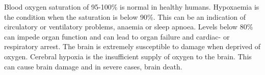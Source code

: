 \medskip
Blood oxygen saturation of 95-100\% is normal in healthy humans. Hypoxaemia is the condition when the saturation is below 90\%. This can be an indication of circulatory or ventilatory problems, anaemia or sleep apnoea. Levels below 80\% can impede organ function and can lead to organ failure and cardiac- or respiratory arrest. The brain is extremely susceptible to damage when deprived of oxygen. Cerebral hypoxia is the insufficient supply of oxygen to the brain. This can cause brain damage and in severe cases, brain death.




%
